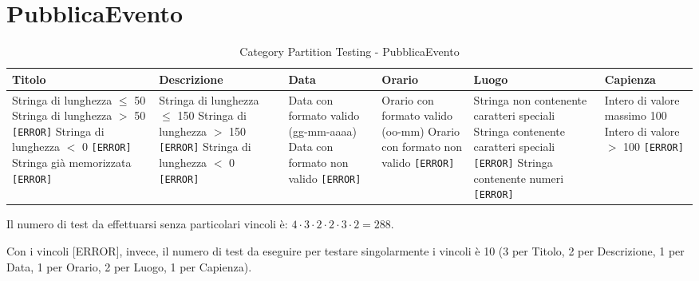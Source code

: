 \section{PubblicaEvento}
\begin{table}[H]
	\centering
	\footnotesize
	\renewcommand{\arraystretch}{1.3}
	\begin{tabular}{|p{2.5cm}|p{2.5cm}|p{2.5cm}|p{2.5cm}|p{2.5cm}|p{2.5cm}|}
		\hline
		\textbf{Titolo} & \textbf{Descrizione} & \textbf{Data} & \textbf{Orario} & \textbf{Luogo} & \textbf{Capienza} \\
		\hline
		Stringa di lunghezza $\leq$ 50 \newline
		Stringa di lunghezza $>$ 50 \texttt{[ERROR]} \newline
		Stringa di lunghezza $<$ 0 \texttt{[ERROR]} \newline
		Stringa già memorizzata \texttt{[ERROR]} &

		Stringa di lunghezza $\leq$ 150 \newline
		Stringa di lunghezza $>$ 150 \texttt{[ERROR]} \newline
		Stringa di lunghezza $<$ 0 \texttt{[ERROR]} &

		Data con formato valido (gg-mm-aaaa) \newline
		Data con formato non valido \texttt{[ERROR]} &

		Orario con formato valido (oo-mm) \newline
		Orario con formato non valido \texttt{[ERROR]} &

		Stringa non contenente caratteri speciali \newline
		Stringa contenente caratteri speciali \texttt{[ERROR]} \newline
		Stringa contenente numeri \texttt{[ERROR]} &

		Intero di valore massimo 100 \newline
		Intero di valore $>$ 100 \texttt{[ERROR]} \\
		\hline
	\end{tabular}
	\caption{Category Partition Testing - PubblicaEvento}
\end{table}

\noindent Il numero di test da effettuarsi senza particolari vincoli è: $4 \cdot 3 \cdot 2 \cdot 2 \cdot 3 \cdot 2 = 288$.

\noindent Con i vincoli [ERROR], invece, il numero di test da eseguire per testare singolarmente i vincoli è 10 (3 per Titolo, 2 per Descrizione, 1 per Data, 1 per Orario, 2 per Luogo, 1 per Capienza).

